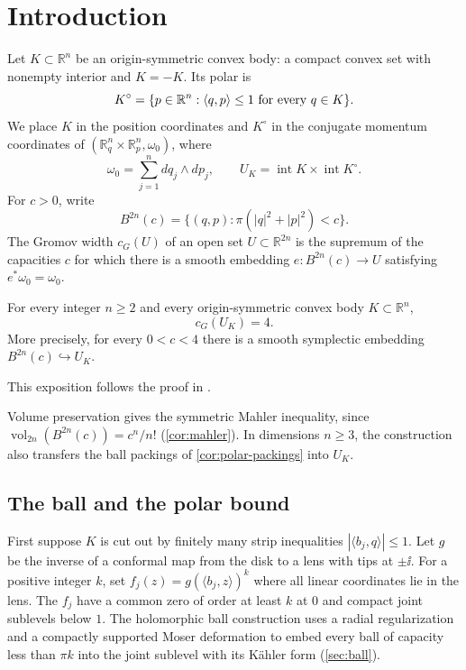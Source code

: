 \section{Introduction}\label{sec:introduction}

Let $K\subset\mathbb{R}^n$ be an origin-symmetric convex body: a compact convex set with nonempty interior and $K=-K$. Its polar is
\[
 K^\circ=\{p\in\mathbb{R}^n:\langle q,p\rangle\le1\text{ for every }q\in K\}.
\]
We place $K$ in the position coordinates and $K^\circ$ in the conjugate momentum coordinates of $(\mathbb{R}^n_q\times\mathbb{R}^n_p,\omega_0)$, where
\[
 \omega_0=\sum_{j=1}^n dq_j\wedge dp_j,
 \qquad U_K=\operatorname{int} K\times\operatorname{int} K^\circ.
\]
For $c>0$, write
\[
 B^{2n}(c)=\{(q,p):\pi(|q|^2+|p|^2)<c\}.
\]
The Gromov width $c_G(U)$ of an open set $U\subset\mathbb{R}^{2n}$ is the supremum of the capacities $c$ for which there is a smooth embedding $e:B^{2n}(c)\to U$ satisfying $e^*\omega_0=\omega_0$.

\begin{maintheorem}\label{thm:main}
For every integer $n\ge2$ and every origin-symmetric convex body $K\subset\mathbb{R}^n$,
\[
 c_G(U_K)=4.
\]
More precisely, for every $0<c<4$ there is a smooth symplectic embedding $B^{2n}(c)\hookrightarrow U_K$.
\end{maintheorem}

This exposition follows the proof in \cite{OpenAIMathSource}.

Volume preservation gives the symmetric Mahler inequality, since $\operatorname{vol}_{2n}(B^{2n}(c))=c^n/n!$ (\cref{cor:mahler}). In dimensions $n\geq3$, the construction also transfers the ball packings of \cref{cor:polar-packings} into $U_K$.

\subsection{The ball and the polar bound}

First suppose $K$ is cut out by finitely many strip inequalities $|\langle b_j,q\rangle|\leq1$. Let $g$ be the inverse of a conformal map from the disk to a lens with tips at $\pm\ii$. For a positive integer $k$, set $f_j(z)=g(\langle b_j,z\rangle)^k$ where all linear coordinates lie in the lens. The $f_j$ have a common zero of order at least $k$ at $0$ and compact joint sublevels below $1$. The holomorphic ball construction uses a radial regularization and a compactly supported Moser deformation to embed every ball of capacity less than $\pi k$ into the joint sublevel with its K\"ahler form (\cref{sec:ball}).

